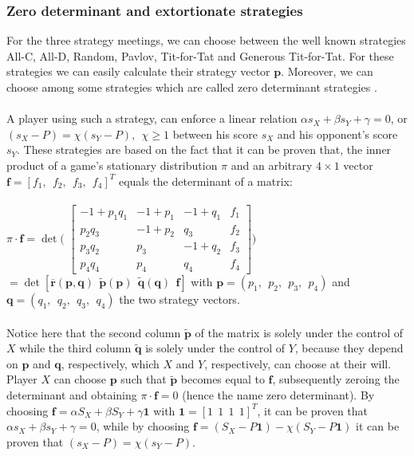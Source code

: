 \documentclass[12pt]{report}
\begin{document}
\subsubsection{Zero determinant and extortionate strategies}
For the three strategy meetings, we can choose between the well known strategies All-C, All-D, Random, Pavlov, Tit-for-Tat and Generous Tit-for-Tat. For these strategies we can easily calculate their strategy vector $\mathbf{p}$. Moreover, we can choose among some strategies which are called zero determinant strategies \cite{pressdyson2012} \cite{ncategory} \cite{wolfram}.
\\\\
A player using such a strategy, can enforce a linear relation $\alpha s_X+\beta s_Y+\gamma=0$, or $(s_X-P)=\chi(s_Y-P), \ \ \chi\ge 1$ between his score $s_X$ and his opponent's score $s_Y$. These strategies are based on the fact that it can be proven that, the inner product of a game's stationary distribution $\pi$ and an arbitrary $4\times 1$ vector $\mathbf{f}=[f_1,\ \ f_2,\ \ f_3,\ \ f_4]^T$ equals the determinant of a matrix:
\\\\
$\pi \cdot \mathbf{f}=\det\Big($
$
 \begin{bmatrix}
-1+p_1q_1 & -1+p_1 & -1+q_1 & f_1 \\
p_2q_3 & -1+p_2 & q_3 & f_2 \\
p_3q_2 & p_3 & -1+q_2 & f_3 \\
p_4q_4 & p_4 & q_4 & f_4 
\end{bmatrix} 
\Big)
$
$=\det[\overline{\mathbf{r}}(\mathbf{p},\mathbf{q})\ \ \tilde{\mathbf{p}}(\mathbf{p})\ \ \tilde{\mathbf{q}}(\mathbf{q})\ \ \mathbf{f}]$ with $\mathbf{p}=(p_1,\ \ p_2,\ \ p_3,\ \ p_4)$ and $\mathbf{q}=(q_1,\ \ q_2,\ \ q_3,\ \ q_4)$ the two strategy vectors.
\\\\
Notice here that the second column $\tilde{\mathbf{p}}$ of the matrix is solely under the control of $X$ while the third column $\tilde{\mathbf{q}}$ is solely under the control of $Y$, because they depend on $\mathbf{p}$ and $\mathbf{q}$, respectively, which $X$ and $Y$, respectively, can choose at their will. Player $X$ can choose $\mathbf{p}$ such that $\tilde{\mathbf{\mathbf{p}}}$ becomes equal to $\mathbf{f}$, subsequently zeroing the determinant and obtaining $\pi\cdot \mathbf{f}=0$ (hence the name zero determinant). By choosing $\mathbf{f}=\alpha S_X+\beta S_Y+\gamma\mathbf{1}$ with $\mathbf{1}=[1\ \ 1\ \ 1\ \ 1]^T$, it can be proven that $\alpha s_X+\beta s_Y+\gamma=0$, while by choosing $\mathbf{f}=(S_X-P\mathbf{1})-\chi(S_Y-P\mathbf{1})$ it can be proven that $(s_X-P)=\chi(s_Y-P)$.
\end{document}
